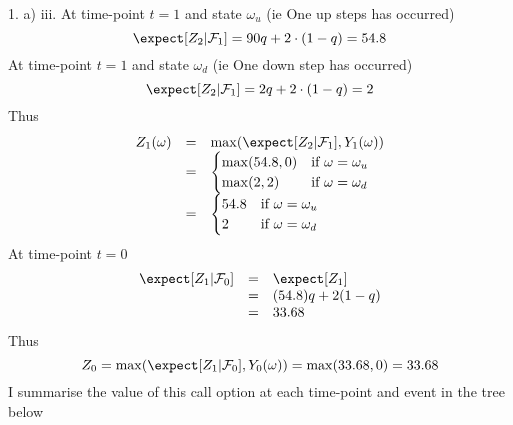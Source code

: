 \documentclass[11pt,a4paper]{article}
\begin{document}
\begin{answer}{1. a) iii.}
  At time-point $t=1$ and state $\omega_{u}$ (ie One up steps has occurred)
  \[ \expect[Z_2|\mathcal{F}_1]=90q+2\cdot(1-q)=54.8 \]
  At time-point $t=1$ and state $\omega_{d}$ (ie One down step has occurred)
  \[ \expect[Z_2|\mathcal{F}_1]=2q+2\cdot(1-q)=2 \]
  Thus
  \[\begin{array}{rcl}
    Z_1(\omega)&=&\max(\expect[Z_2|\mathcal{F}_1],Y_1(\omega))\\
    &=&\begin{cases}
      \max(54.8,0)&\text{if }\omega=\omega_u\\
      \max(2,2)&\text{if }\omega=\omega_d
    \end{cases}\\
    &=&\begin{cases}
      54.8&\text{if }\omega=\omega_u\\
      2&\text{if }\omega=\omega_d
    \end{cases}
  \end{array}\]
  At time-point $t=0$
  \[\begin{array}{rcl}
    \expect[Z_1|\mathcal{F}_0]&=&\expect[Z_1]\\
    &=&(54.8)q+2(1-q)\\
    &=&33.68
  \end{array}\]
  Thus
  \[ Z_0=\max(\expect[Z_1|\mathcal{F}_0],Y_0(\omega))=\max(33.68,0)=33.68 \]
  I summarise the value of this call option at each time-point and event in the tree below
  \begin{center}
  \end{center}

\end{answer}
\end{document}

